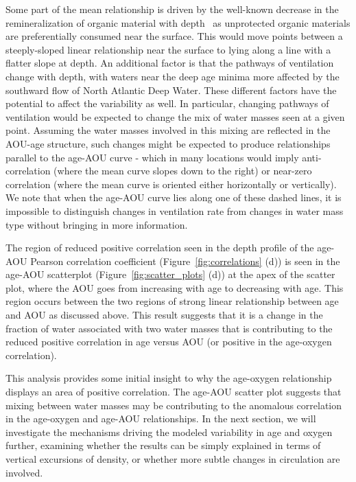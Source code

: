 Some part of the mean relationship is driven by the well-known decrease in the
remineralization of organic material with depth~\citep{Armstrong2002,Klaas2002}
as unprotected organic materials are preferentially consumed near the surface.
This would move points between a steeply-sloped linear relationship near the
surface to lying along a line with a flatter slope at depth. An additional
factor is that the pathways of ventilation change with depth, with waters near
the deep age minima more affected by the southward flow of North Atlantic Deep
Water. These different factors have the potential to affect the variability as
well. In particular, changing pathways of ventilation would be expected to
change the mix of water masses seen at a given point. Assuming the water masses
involved in this mixing are reflected in the AOU-age structure, such changes
might be expected to produce relationships parallel to the age-AOU curve - which
in many locations would imply anti-correlation (where the mean curve slopes down
to the right) or near-zero correlation (where the mean curve is oriented either
horizontally or vertically). We note that when the age-AOU curve lies along one
of these dashed lines, it is impossible to distinguish changes in ventilation
rate from changes in water mass type without bringing in more information.

The region of reduced positive correlation seen in the depth profile of the age-AOU
Pearson correlation coefficient (Figure~\ref{fig:correlations} (d)) is seen in the
age-AOU scatterplot (Figure~\ref{fig:scatter_plots} (d)) at the apex of the scatter
plot, where the AOU goes from increasing with age to decreasing with age. This
region occurs between the two regions of strong linear relationship between age
and AOU as discussed above. This result suggests that it is a change in the
fraction of water associated with two water masses that is contributing to the
reduced positive correlation in age versus AOU (or positive in the age-oxygen
correlation).

This analysis provides some initial insight to why the age-oxygen relationship
displays an area of positive correlation. The age-AOU scatter plot suggests that
mixing between water masses may be contributing to the anomalous correlation in
the age-oxygen and age-AOU relationships. In the next section, we will investigate
the mechanisms driving the modeled variability in age and oxygen further,
examining whether the results can be simply explained in terms of vertical
excursions of density, or whether more subtle changes in circulation are involved.

